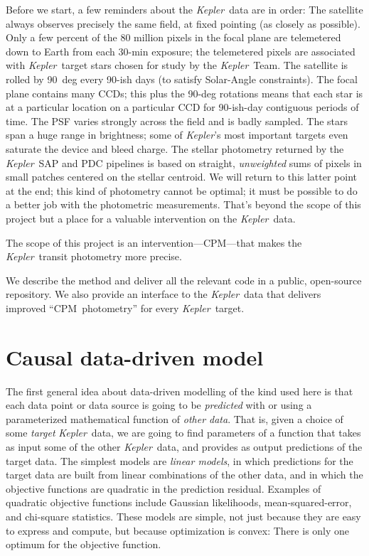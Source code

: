 \documentclass[12pt, preprint]{aastex}
\newcommand{\project}[1]{\textsl{#1}}
\newcommand{\Kepler}{\project{Kepler}}
\newcommand{\name}{CPM}
\begin{document}
Before we start, a few reminders about the \Kepler\ data are in order:
The satellite always observes precisely the same field, at fixed pointing (as closely as possible).
Only a few percent of the 80 million pixels in the focal plane are telemetered down
  to Earth from each 30-min exposure;
  the telemetered pixels are associated with \Kepler\ target stars chosen for study by the \Kepler\ Team.
The satellite is rolled by 90~deg every 90-ish days (to satisfy Solar-Angle constraints).
The focal plane contains many CCDs;
  this plus the 90-deg rotations means that each star is at a particular location
  on a particular CCD for 90-ish-day contiguous periods of time.
The PSF varies strongly across the field and is badly sampled.
The stars span a huge range in brightness;
  some of \Kepler's most important targets even saturate the device and bleed charge.
The stellar photometry returned by the \Kepler\ SAP and PDC pipelines is based on
  straight, \emph{unweighted} sums of pixels in small patches centered on the stellar centroid.
We will return to this latter point at the end;
  this kind of photometry cannot be optimal;
  it must be possible to do a better job with the photometric measurements.
That's beyond the scope of this project but a place for a valuable intervention on the \Kepler\ data.

The scope of this project is an intervention---\name---that makes the \Kepler\ transit photometry more precise.

We describe the method and deliver all the relevant code in a public, open-source repository.
We also provide an interface to the \Kepler\ data that delivers improved ``\name\ photometry''
  for every \Kepler\ target.

\section{Causal data-driven model}

The first general idea about data-driven modelling of the kind used here
  is that each data point or data source is going to be 
  \emph{predicted} with or using a parameterized mathematical function of \emph{other data}.
That is, given a choice of some \emph{target} \Kepler\ data,
  we are going to find parameters of a function that takes as input some of the other \Kepler\ data,
  and provides as output predictions of the target data.
The simplest models are \emph{linear models},
  in which predictions for the target data are built from linear combinations of the other data,
  and in which the objective functions are quadratic in the prediction residual.
Examples of quadratic objective functions include Gaussian likelihoods, mean-squared-error, and chi-square statistics.
These models are simple,
  not just because they are easy to express and compute,
  but because optimization is convex:
There is only one optimum for the objective function.
\end{document}

